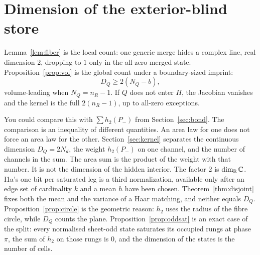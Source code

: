 \section{Dimension of the exterior-blind store}
\label{sec:h-bhq}

Lemma~\ref{lem:fiber} is the local count: one generic merge hides a complex
line, real dimension \(2\), dropping to \(1\) only in the all-zero merged state.
Proposition~\ref{prop:vol} is the global count under a boundary-sized imprint:
\[
D_Q\ge 2(N_Q-b),
\]
volume-leading when \(N_Q=n_R-1\).
If \(Q\) does not enter \(H\), the Jacobian vanishes and the kernel is the
full \(2(n_R-1)\), up to all-zero exceptions.

You could compare this with \(\sum h_2(P_-)\) from Section~\ref{sec:bond}.
The comparison is an inequality of different quantities.
An area law for one does not force an area law for the other.
Section~\ref{sec:kernel} separates the continuous dimension \(D_Q=2N_d\),
the weight \(h_2(P_-)\) on one channel, and the number of channels in the sum.
The area sum is the product of the weight with that number.
It is not the dimension of the hidden interior.
The factor \(2\) is \(\dim_{\mathbb{R}}\mathbb{C}\).
I1a's one bit per saturated leg is a third normalization, available only
after an edge set of cardinality \(k\) and a mean \(\bar h\) have been chosen.
Theorem~\ref{thm:disjoint} fixes both the mean and the variance of a Haar
matching, and neither equals \(D_Q\).
Proposition~\ref{prop:circle} is the geometric reason:
\(h_2\) uses the radius of the fibre circle, while \(D_Q\) counts the plane.
Proposition~\ref{prop:oddsat} is an exact case of the split:
every normalised sheet-odd state saturates its occupied rungs at phase
\(\pi\), the sum of \(h_2\) on those rungs is \(0\), and the dimension of
the states is the number of cells.
